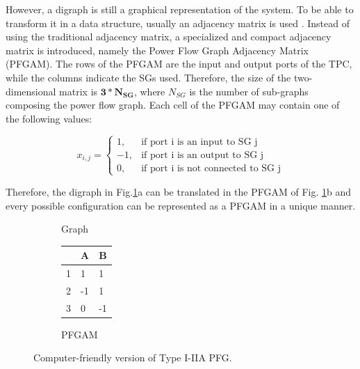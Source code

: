 \documentclass[conference]{IEEEtran}
\begin{document}
However, a digraph is still a graphical representation of the system. To be able to transform it in a data structure, usually an adjacency matrix is used \cite{dorfler_electrical_2018}. Instead of using the traditional adjacency matrix, a specialized and compact adjacency matrix is introduced, namely the Power Flow Graph Adjacency Matrix (PFGAM). The rows of the PFGAM are the input and output ports of the TPC, while the columns indicate the SGs used. Therefore, the size of the two-dimensional matrix is \( \mathbf{3 * N_{SG}} \), where $N_{SG}$ is the number of sub-graphs composing the power flow graph.
Each cell of the PFGAM may contain one of the following values:

\begin{equation}
x_{i,j} = 
\begin{cases}
    1, & \text{if port i is an input to SG j} \\
    -1, & \text{if port i is an output to SG j} \\
    0, & \text{if port i is not connected to SG j} 
\end{cases}
\end{equation}

Therefore, the digraph in Fig.\ref{fig:I-IIA-cf}a can be translated in the PFGAM of Fig. \ref{fig:I-IIA-cf}b and every possible configuration can be represented as a PFGAM in a unique manner.

\begin{figure}[htbp]\begin{minipage}{\columnwidth}\centering
        \begin{subfigure}{0.45\columnwidth}\centering
         \caption{Graph}
        \end{subfigure}\hfill
        \begin{subfigure}{0.45\columnwidth}\centering
        \begin{tabular}{| m{2pt} || m{9pt} | m{9pt} ||} 
         \hline
         & A & B \\ [0.5ex] 
         \hline\hline
         1 & 1 & 1  \\ 
         \hline
         2 & -1 & 1 \\
         \hline
         3 & 0 & -1 \\
         \hline
         \hline
        \end{tabular}\caption{PFGAM}\end{subfigure}
        \caption{Computer-friendly version of Type I-IIA PFG.}\label{fig:I-IIA-cf}\end{minipage}
\end{figure} 
\end{document}
